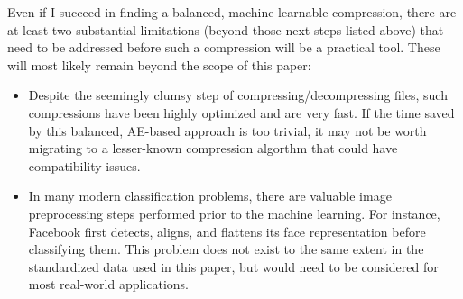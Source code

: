\documentclass[twoside,11pt]{article}
\begin{document}
Even if I succeed in finding a balanced, machine learnable compression, there are at 
least two substantial limitations (beyond those next steps listed above) that need 
to be addressed before such a compression will be a practical tool. These will most 
likely remain beyond the scope of this paper:
\begin{itemize}
    \item Despite the seemingly clumsy step of compressing/decompressing files, 
    such compressions have been highly optimized and are very fast. If the time saved 
    by this balanced, AE-based approach is too trivial, it may not be worth migrating
    to a lesser-known compression algorthm that could have compatibility issues.

    \item In many modern classification problems, there are valuable image 
    preprocessing steps performed prior to the machine learning. 
    For instance, Facebook first detects, aligns, and flattens its
    face representation before classifying them. This problem does not exist to the
    same extent in the
    standardized data used in this paper, but would need to be considered for most
    real-world applications.
\end{itemize}








\end{document}
